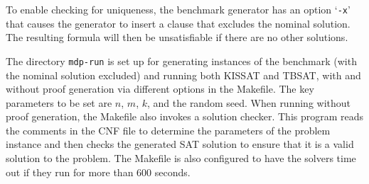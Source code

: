 To enable checking for uniqueness, the benchmark generator has an
option `\texttt{-x}' that causes the generator to insert a clause that
excludes the nominal solution.  The resulting formula will then be
unsatisfiable if there are no other solutions.

The directory \texttt{mdp-run} is set up for generating instances of
the benchmark (with the nominal solution excluded) and running both
KISSAT and TBSAT, with and without proof generation via different
options in the Makefile.  The key parameters to be set are $n$, $m$,
$k$, and the random seed.  When running without proof generation, the
Makefile also invokes a solution checker.  This program reads the
comments in the CNF file to determine the parameters of the problem
instance and then checks the generated SAT solution to ensure that it
is a valid solution to the problem.  The Makefile is also configured
to have the solvers time out if they run for more than 600 seconds.


